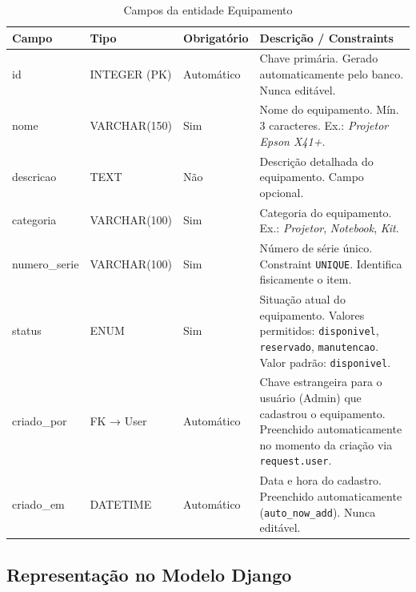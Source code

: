\documentclass[12pt,a4paper]{article}
\begin{document}
\begin{table}[h]
\centering
\small
\begin{tabular}{T{2.8cm} L{3.2cm} L{2.8cm} L{4.6cm}}
  \toprule
  \textbf{Campo} & \textbf{Tipo} & \textbf{Obrigatório} & \textbf{Descrição / Constraints} \\
  \midrule

  id
    & INTEGER (PK)
    & Automático
    & Chave primária. Gerado automaticamente pelo banco. Nunca editável. \\
  \addlinespace

  nome
    & VARCHAR(150)
    & Sim
    & Nome do equipamento. Mín. 3 caracteres. Ex.: \textit{Projetor Epson X41+}. \\
  \addlinespace

  descricao
    & TEXT
    & Não
    & Descrição detalhada do equipamento. Campo opcional. \\
  \addlinespace

  categoria
    & VARCHAR(100)
    & Sim
    & Categoria do equipamento. Ex.: \textit{Projetor}, \textit{Notebook}, \textit{Kit}. \\
  \addlinespace

  numero\_serie
    & VARCHAR(100)
    & Sim
    & Número de série único. Constraint \texttt{UNIQUE}. Identifica fisicamente o item. \\
  \addlinespace

  status
    & ENUM
    & Sim
    & Situação atual do equipamento. Valores permitidos: \texttt{disponivel}, \texttt{reservado}, \texttt{manutencao}. Valor padrão: \texttt{disponivel}. \\
  \addlinespace

  criado\_por
    & FK → User
    & Automático
    & Chave estrangeira para o usuário (Admin) que cadastrou o equipamento. Preenchido automaticamente no momento da criação via \texttt{request.user}. \\
  \addlinespace

  criado\_em
    & DATETIME
    & Automático
    & Data e hora do cadastro. Preenchido automaticamente (\texttt{auto\_now\_add}). Nunca editável. \\

  \bottomrule
\end{tabular}
\caption{Campos da entidade Equipamento}
\end{table}

\subsection{Representação no Modelo Django}
\end{document}
